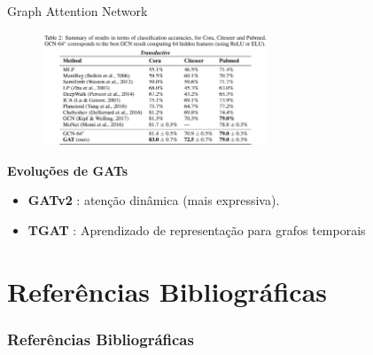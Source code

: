 \documentclass{beamer}
\begin{document}
\begin{frame}{Graph Attention Network \cite{velickovic2018gats}}
  \begin{figure}[h]
    \centering
    \includegraphics[width=0.6\textwidth]{assets/GAT-performance.png}
  \end{figure}
  \textbf{Evoluções de GATs}
  \small
  \begin{itemize}
    \item \textbf{GATv2} \cite{brody2022gatv2}: atenção dinâmica (mais expressiva).
    \item \textbf{TGAT} \cite{Xu2020InductiveRL}: Aprendizado de representação para grafos temporais
  \end{itemize}

\end{frame}

\section{Referências Bibliográficas}
\begin{frame}[allowframebreaks]
	\frametitle{Referências Bibliográficas}
	
	
\end{frame}
\end{document}
